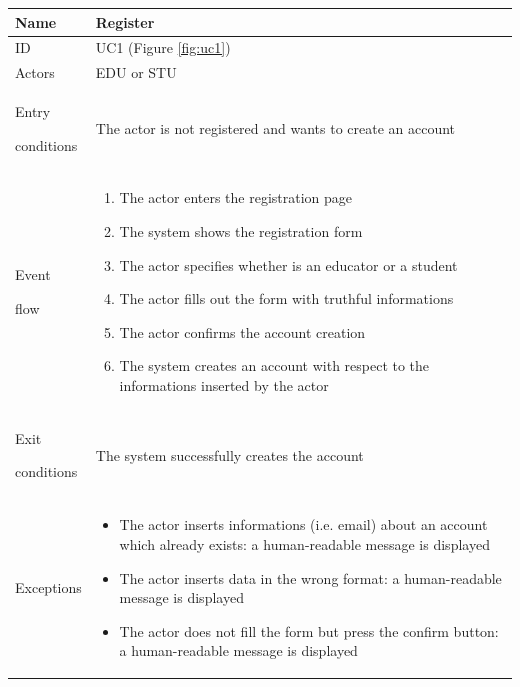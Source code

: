 \begin{center}
    \def\arraystretch{1.5}
    \begin{tabular}{| m{2cm} | m{10cm}|}
        \hline
        Name                  & Register                                                                                                                      \\ \hline
        ID                    & UC1 (Figure \ref{fig:uc1})                                                                                                    \\ \hline
        Actors                & EDU or STU                                                                                                                    \\ \hline
        Entry \par conditions & The actor is not registered and wants to create an account                                                                    \\ \hline
        Event \par flow       & \begin{enumerate}
                                    \item The actor enters the registration page
                                    \item The system shows the registration form
                                    \item The actor specifies whether is an educator or a student
                                    \item The actor fills out the form with truthful informations
                                    \item The actor confirms the account creation
                                    \item The system creates an account with respect to the informations inserted by the actor
                                \end{enumerate}                                     \\ \hline
        Exit \par conditions  & The system successfully creates the account                                                                                   \\ \hline
        Exceptions            & \begin{itemize}
                                    \item The actor inserts informations (i.e. email) about an account which already exists: a human-readable message is displayed
                                    \item The actor inserts data in the wrong format: a human-readable message is displayed
                                    \item The actor does not fill the form but press the confirm button: a human-readable message is displayed
                                \end{itemize} \\ \hline
    \end{tabular}
\end{center}

